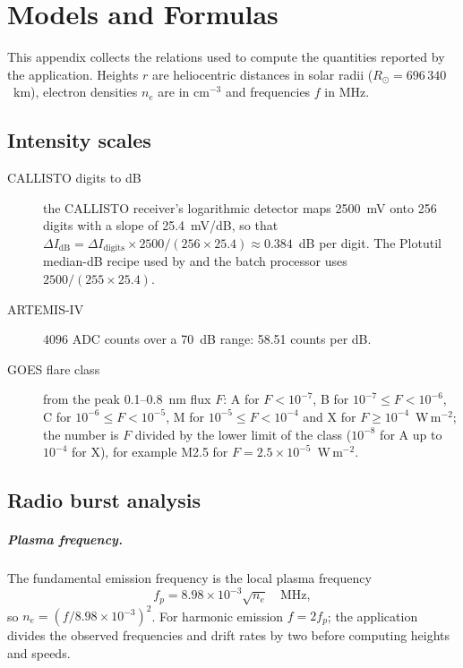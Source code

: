 \chapter{Models and Formulas}
\label{app:formulas}

This appendix collects the relations used to compute the quantities reported by the
application. Heights \(r\) are heliocentric distances in solar radii (\(R_\odot = 696\,340\)~km),
electron densities \(n_e\) are in cm\(^{-3}\) and frequencies \(f\) in MHz.

\section{Intensity scales}

\begin{description}
  \item[CALLISTO digits to dB] the CALLISTO receiver's logarithmic detector maps 2500~mV onto
    256 digits with a slope of 25.4~mV/dB, so that
    \(\Delta I_\mathrm{dB} = \Delta I_\mathrm{digits}\times 2500/(256\times25.4)\approx
    0.384\)~dB per digit. The Plotutil median-dB recipe used by  and the
    batch processor uses \(2500/(255\times25.4)\).
  \item[ARTEMIS-IV] \(4096\) ADC counts over a 70~dB range: 58.51 counts per dB.
  \item[GOES flare class] from the peak 0.1--0.8~nm flux \(F\): A for \(F<10^{-7}\), B for
    \(10^{-7}\le F<10^{-6}\), C for \(10^{-6}\le F<10^{-5}\), M for \(10^{-5}\le F<10^{-4}\) and
    X for \(F\ge10^{-4}\)~W\,m\(^{-2}\); the number is \(F\) divided by the lower limit of the class (\(10^{-8}\) for A up to \(10^{-4}\) for X), for example M2.5 for \(F = 2.5\times10^{-5}\)~W\,m\(^{-2}\).
\end{description}

\section{Radio burst analysis}

\paragraph{Plasma frequency.} The fundamental emission frequency is the local plasma frequency
\begin{equation}
  f_p = 8.98\times10^{-3}\sqrt{n_e}\quad\text{MHz},
\end{equation}
so \(n_e = (f/8.98\times10^{-3})^2\). For harmonic emission \(f = 2f_p\); the application divides
the observed frequencies and drift rates by two before computing heights and speeds.


